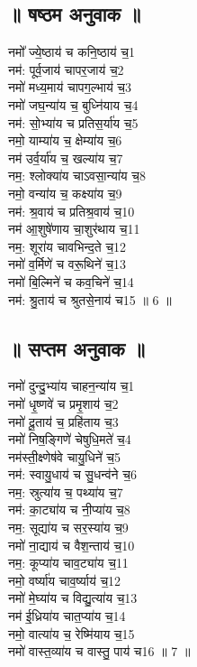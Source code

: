 \subsection{॥ षष्ठम अनुवाक ॥}
नमो᳚ ज्ये॒ष्ठाय॑ च कनि॒ष्ठाय॑ च॒{\small 1}\\
नम॑: पूर्व॒जाय॑ चापर॒जाय॑ च॒{\small 2}\\
नमो॑ मध्य॒माय॑ चापग॒ल्भाय॑ च॒{\small 3}\\
नमो॑ जघ॒न्या॑य च॒ बुध्नि॑याय च॒{\small 4}\\
नम॑: सो॒भ्या॑य च प्रतिस॒र्या॑य च॒{\small 5}\\
नमो॒ याम्या॑य च॒ क्षेम्या॑य च॒{\small 6}\\
नम॑ उर्व॒र्या॑य च॒ खल्या॑य च॒{\small 7}\\
नम॒: श्लोक्या॑य चाऽवसा॒न्या॑य च॒{\small 8}\\
नमो॒ वन्या॑य च॒ कक्ष्या॑य च॒{\small 9}\\
नम॑: श्र॒वाय॑ च प्रतिश्र॒वाय॑ च॒{\small 10}\\
नम॑ आ॒शुषे॑णाय चा॒शुर॑थाय च॒{\small 11}\\
नम॒: शूरा॑य चावभिन्द॒ते च॒{\small 12}\\
नमो॑ व॒र्मिणे॑ च वरू॒थिने॑ च॒{\small 13}\\
नमो॑ बि॒ल्मिने॑ च कव॒चिने॑ च॒{\small 14}\\
नम॑: श्रु॒ताय॑ च श्रुतसे॒नाय॑ च{\small 15} ॥ 6 ॥\\
\subsection{॥ सप्तम अनुवाक ॥}
नमो॑ दुन्दु॒भ्या॑य चाहन॒न्या॑य च॒{\small 1}\\
नमो॑ धृ॒ष्णवे॑ च प्रमृ॒शाय॑ च॒{\small 2}\\
नमो॑ दू॒ताय॑ च॒ प्रहि॑ताय च॒{\small 3}\\
नमो॑ निष॒ङ्गिणे॑ चेषुधि॒मते॑ च॒{\small 4}\\
नम॑स्ती॒क्ष्णेष॑वे चायु॒धिने॑ च॒{\small 5}\\
नम॑: स्वायु॒धाय॑ च सु॒धन्व॑ने च॒{\small 6}\\
नम॒: स्रुत्या॑य च॒ पथ्या॑य च॒{\small 7}\\
नम॑: का॒ट्या॑य च नी॒प्या॑य च॒{\small 8}\\
नम॒: सूद्या॑य च सर॒स्या॑य च॒{\small 9}\\
नमो॑ ना॒द्याय॑ च वैश॒न्ताय॑ च॒{\small 10}\\
नम॒: कूप्या॑य चाव॒ट्या॑य च॒{\small 11}\\
नमो॒ वर्ष्या॑य चाव॒र्ष्याय॑ च॒{\small 12}\\
नमो॑ मे॒घ्या॑य च विद्यु॒त्या॑य च॒{\small 13}\\
नम॑ ई॒ध्रिया॑य चात॒प्या॑य च॒{\small 14}\\
नमो॒ वात्या॑य च॒ रेष्मि॑याय च॒{\small 15}\\
नमो॑ वास्त॒व्या॑य च वास्तु॒ पाय॑ च{\small 16} ॥ 7 ॥\\
